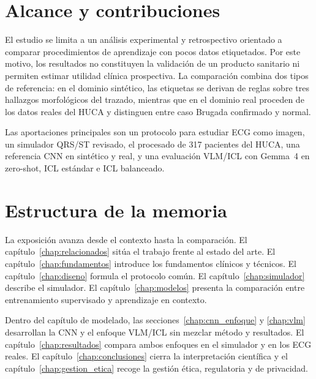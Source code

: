 \section{Alcance y contribuciones}

El estudio se limita a un análisis experimental y retrospectivo orientado a comparar procedimientos de aprendizaje con pocos datos etiquetados. Por este motivo, los resultados no constituyen la validación de un producto sanitario ni permiten estimar utilidad clínica prospectiva. La comparación combina dos tipos de referencia: en el dominio sintético, las etiquetas se derivan de reglas sobre tres hallazgos morfológicos del trazado, mientras que en el dominio real proceden de los datos reales del HUCA y distinguen entre caso Brugada confirmado y normal.

Las aportaciones principales son un protocolo para estudiar ECG como imagen, un simulador QRS/ST revisado, el procesado de 317 pacientes del HUCA, una referencia CNN en sintético y real, y una evaluación VLM/ICL con Gemma~4 en zero-shot, ICL estándar e ICL balanceado.

\section{Estructura de la memoria}

La exposición avanza desde el contexto hasta la comparación. El capítulo~\ref{chap:relacionados} sitúa el trabajo frente al estado del arte. El capítulo~\ref{chap:fundamentos} introduce los fundamentos clínicos y técnicos. El capítulo~\ref{chap:diseno} formula el protocolo común. El capítulo~\ref{chap:simulador} describe el simulador. El capítulo~\ref{chap:modelos} presenta la comparación entre entrenamiento supervisado y aprendizaje en contexto.

Dentro del capítulo de modelado, las secciones~\ref{chap:cnn_enfoque} y \ref{chap:vlm} desarrollan la CNN y el enfoque VLM/ICL sin mezclar método y resultados. El capítulo~\ref{chap:resultados} compara ambos enfoques en el simulador y en los ECG reales. El capítulo~\ref{chap:conclusiones} cierra la interpretación científica y el capítulo~\ref{chap:gestion_etica} recoge la gestión ética, regulatoria y de privacidad.
